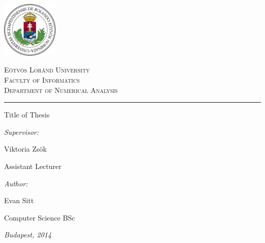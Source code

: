 \begin{titlepage}

\noindent
\parbox[m]{0.2\textwidth}{
 \includegraphics[width=0.2\textwidth]{elte_logo_color.eps} %
}
\hfill
\parbox[m]{0.7\textwidth}{
\begin{center}
\begin{large}
\textsc{
E\"otv\"os Lor\'and University\\
\vspace{0.5pc}
Faculty of Informatics\\
\vspace{0.5pc}
Department of Numerical Analysis\\
}
\end{large}
\end{center}
}

\vspace{1pc}
\hrule

\vfill

\begin{center}
{\LARGE Title of Thesis}
\end{center}

\vfill

\noindent
\hspace*{0.05\textwidth}
\parbox{0.45\textwidth}{
{\it Supervisor:}
\bigskip

{\Large Viktoria Zs\"ok}
\smallskip

Assistant Lecturer
}
\hfill
\parbox{0.45\textwidth}{
{\it Author:}
\bigskip

{\Large Evan Sitt}
\smallskip

Computer Science BSc
}


\vfill

\begin{center}
{\large {\it Budapest, 2014}}
\end{center}

\end{titlepage}
